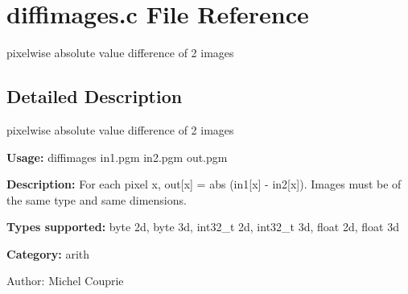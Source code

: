 \section{diffimages.c File Reference}
\label{diffimages_8c}
pixelwise absolute value difference of 2 images  




\label{_details}
\subsection{Detailed Description}
pixelwise absolute value difference of 2 images 

{\bf Usage:} diffimages in1.pgm in2.pgm out.pgm

{\bf Description:} For each pixel x, out[x] = abs (in1[x] - in2[x]). Images must be of the same type and same dimensions.

{\bf Types supported:} byte 2d, byte 3d, int32\_\-t 2d, int32\_\-t 3d, float 2d, float 3d

{\bf Category:} arith

\begin{Desc}
\item[Author:]Michel Couprie \end{Desc}
